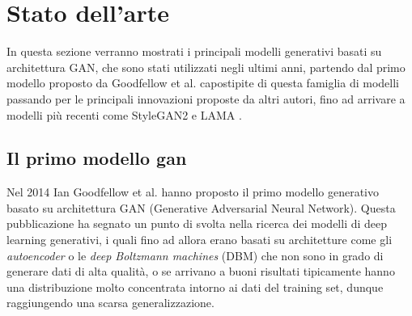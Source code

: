 \chapter{Stato dell'arte}

In questa sezione verranno mostrati i principali modelli generativi basati su architettura GAN, che sono stati utilizzati negli ultimi anni, partendo dal 
primo modello proposto da Goodfellow et al. \cite{goodfellow2014generative} capostipite di questa famiglia di modelli passando per le principali innovazioni
proposte da altri autori, fino ad arrivare a modelli più recenti come StyleGAN2 \cite{karras2020analyzing} e LAMA \cite{suvorov2021resolutionrobust}.

\section{Il primo modello gan}
Nel 2014 Ian Goodfellow et al. \cite{goodfellow2014generative} hanno proposto il primo modello generativo basato su architettura GAN (Generative Adversarial Neural Network).
Questa pubblicazione ha segnato un punto di svolta nella ricerca dei modelli di deep learning generativi, i quali fino ad allora erano
basati su architetture come gli \textit{autoencoder} o le \textit{deep Boltzmann machines} (DBM) che non sono in grado di generare dati di alta qualità,
o se arrivano a buoni risultati tipicamente hanno una distribuzione molto concentrata intorno ai dati del training set, dunque raggiungendo una scarsa generalizzazione.


